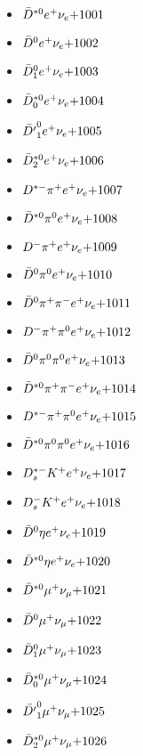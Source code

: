 
 \begin{multicols}{3} 
 \begin{itemize}
 \item $ \bar{D}^{*0} e^{+} \nu_{e} \hfill{+1001}$
 \item $ \bar{D}^{0} e^{+} \nu_{e} \hfill{+1002}$
 \item $ \bar{D}_{1}^{0} e^{+} \nu_{e} \hfill{+1003}$
 \item $ \bar{D}_{0}^{*0} e^{+} \nu_{e} \hfill{+1004}$
 \item $ \bar{{D^{\prime}}}_{1}^{0} e^{+} \nu_{e} \hfill{+1005}$
 \item $ \bar{D}_{2}^{*0} e^{+} \nu_{e} \hfill{+1006}$
 \item $ D^{*-} \pi^{+} e^{+} \nu_{e} \hfill{+1007}$
 \item $ \bar{D}^{*0} \pi^{0} e^{+} \nu_{e} \hfill{+1008}$
 \item $ D^{-} \pi^{+} e^{+} \nu_{e} \hfill{+1009}$
 \item $ \bar{D}^{0} \pi^{0} e^{+} \nu_{e} \hfill{+1010}$
 \item $ \bar{D}^{0} \pi^{+} \pi^{-} e^{+} \nu_{e} \hfill{+1011}$
 \item $ D^{-} \pi^{+} \pi^{0} e^{+} \nu_{e} \hfill{+1012}$
 \item $ \bar{D}^{0} \pi^{0} \pi^{0} e^{+} \nu_{e} \hfill{+1013}$
 \item $ \bar{D}^{*0} \pi^{+} \pi^{-} e^{+} \nu_{e} \hfill{+1014}$
 \item $ D^{*-} \pi^{+} \pi^{0} e^{+} \nu_{e} \hfill{+1015}$
 \item $ \bar{D}^{*0} \pi^{0} \pi^{0} e^{+} \nu_{e} \hfill{+1016}$
 \item $ D_{s}^{*-} K^{+} e^{+} \nu_{e} \hfill{+1017}$
 \item $ D_{s}^{-} K^{+} e^{+} \nu_{e} \hfill{+1018}$
 \item $ \bar{D}^{0} \eta e^{+} \nu_{e} \hfill{+1019}$
 \item $ \bar{D}^{*0} \eta e^{+} \nu_{e} \hfill{+1020}$
 \item $ \bar{D}^{*0} \mu^{+} \nu_{\mu} \hfill{+1021}$
 \item $ \bar{D}^{0} \mu^{+} \nu_{\mu} \hfill{+1022}$
 \item $ \bar{D}_{1}^{0} \mu^{+} \nu_{\mu} \hfill{+1023}$
 \item $ \bar{D}_{0}^{*0} \mu^{+} \nu_{\mu} \hfill{+1024}$
 \item $ \bar{{D^{\prime}}}_{1}^{0} \mu^{+} \nu_{\mu} \hfill{+1025}$
 \item $ \bar{D}_{2}^{*0} \mu^{+} \nu_{\mu} \hfill{+1026}$

\end{itemize}
\end{multicols}

